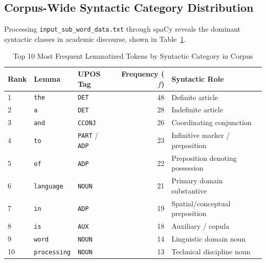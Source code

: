 \documentclass[12pt,a4paper]{report}
\begin{document}
\subsection{Corpus-Wide Syntactic Category Distribution}
Processing \texttt{input\_sub\_word\_data.txt} through spaCy reveals the dominant syntactic classes in academic discourse, shown in Table~\ref{tab:exp5_corpus_pos}.
\begin{table}[H]
\centering
\small
\caption{Top 10 Most Frequent Lemmatized Tokens by Syntactic Category in Corpus}
\label{tab:exp5_corpus_pos}
\begin{tabular}{lllrp{6cm}}
\toprule
\textbf{Rank} & \textbf{Lemma} & \textbf{UPOS Tag} & \textbf{Frequency ($f$)} & \textbf{Syntactic Role} \\
\midrule
1 & \texttt{the} & \texttt{DET} & 48 & Definite article \\
2 & \texttt{a} & \texttt{DET} & 28 & Indefinite article \\
3 & \texttt{and} & \texttt{CCONJ} & 26 & Coordinating conjunction \\
4 & \texttt{to} & \texttt{PART} / \texttt{ADP} & 23 & Infinitive marker / preposition \\
5 & \texttt{of} & \texttt{ADP} & 22 & Preposition denoting possession \\
6 & \texttt{language} & \texttt{NOUN} & 21 & Primary domain substantive \\
7 & \texttt{in} & \texttt{ADP} & 19 & Spatial/conceptual preposition \\
8 & \texttt{is} & \texttt{AUX} & 18 & Auxiliary / copula \\
9 & \texttt{word} & \texttt{NOUN} & 14 & Linguistic domain noun \\
10 & \texttt{processing} & \texttt{NOUN} & 13 & Technical discipline noun \\
\bottomrule
\end{tabular}
\end{table}
\end{document}
